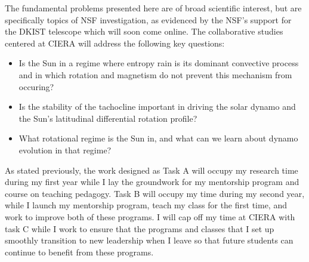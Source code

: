 \documentclass[aasms,11pt]{article}
\begin{document}
The fundamental problems presented here are of broad scientific interest, but are specifically topics of NSF investigation, as evidenced by the NSF's support for the DKIST telescope which will soon come online.
The collaborative studies centered at CIERA will address the following key questions:
\begin{itemize}
\vspace{-9pt}
\item Is the Sun in a regime where entropy rain is its dominant convective process and in which rotation and magnetism do not prevent this mechanism from occuring?
\vspace{-9pt}
\item Is the stability of the tachocline important in driving the solar dynamo and the Sun's latitudinal differential rotation profile?
\vspace{-9pt}
\item What rotational regime is the Sun in, and what can we learn about dynamo evolution in that regime?
\vspace{-9pt}
\end{itemize}

As stated previously, the work designed as Task A will occupy my research time during my first year while I lay the groundwork for my mentorship program and course on teaching pedagogy.
Task B will occupy my time during my second year, while I launch my mentorship program, teach my class for the first time, and work to improve both of these programs.
I will cap off my time at CIERA with task C while I work to ensure that the programs and classes that I set up smoothly transition to new leadership when I leave so that future students can continue to benefit from these programs.


\newpage


\end{document}
